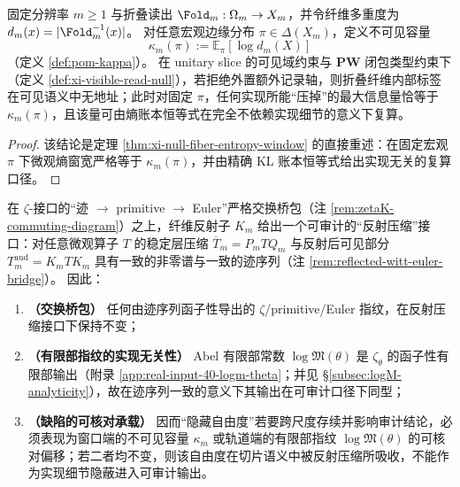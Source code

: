 \begin{theorem}\label{thm:xi-kappa-unique-carrier}
固定分辨率 \(m\ge 1\) 与折叠读出 \(\Fold_m:\Omega_m\to X_m\)，并令纤维多重度为 \(d_m(x)=|\Fold_m^{-1}(x)|\)。
对任意宏观边缘分布 \(\pi\in\Delta(X_m)\)，定义不可见容量
\[
\kappa_m(\pi):=\mathbb{E}_{\pi}[\log d_m(X)]
\]
（定义 \ref{def:pom-kappa}）。
在 unitary slice 的可见域约束与 \(\mathbf{PW}\) 闭包类型约束下（定义 \ref{def:xi-visible-read-null}），若拒绝外置额外记录轴，则折叠纤维内部标签在可见语义中无地址；此时对固定 \(\pi\)，任何实现所能“压掉”的最大信息量恰等于 \(\kappa_m(\pi)\)，且该量可由熵账本恒等式在完全不依赖实现细节的意义下复算。
\end{theorem}

\begin{proof}
该结论是定理 \ref{thm:xi-null-fiber-entropy-window} 的直接重述：在固定宏观 \(\pi\) 下微观熵窗宽严格等于 \(\kappa_m(\pi)\)，并由精确 KL 账本恒等式给出实现无关的复算口径。
\end{proof}

\begin{theorem}\label{thm:xi-defect-window-orbit-bridge}
在 \(\zeta\)-接口的“迹 \(\to\) primitive \(\to\) Euler”严格交换桥包（注 \ref{rem:zetaK-commuting-diagram}）之上，纤维反射子 \(K_m\) 给出一个可审计的“反射压缩”接口：对任意微观算子 \(T\) 的稳定层压缩 \(\overline T_m=P_mTQ_m\) 与反射后可见部分 \(T_m^{\mathrm{aud}}=K_mTK_m\) 具有一致的非零谱与一致的迹序列（注 \ref{rem:reflected-witt-euler-bridge}）。
因此：
\begin{enumerate}
  \item \textbf{（交换桥包）}
  任何由迹序列函子性导出的 \(\zeta\)/primitive/Euler 指纹，在反射压缩接口下保持不变；
  \item \textbf{（有限部指纹的实现无关性）}
  Abel 有限部常数 \(\log\mathfrak{M}(\theta)\) 是 \(\zeta_\theta\) 的函子性有限部输出（附录 \ref{app:real-input-40-logm-theta}；并见 \S\ref{subsec:logM-analyticity}），故在迹序列一致的意义下其输出在可审计口径下同型；
  \item \textbf{（缺陷的可核对承载）}
  因而“隐藏自由度”若要跨尺度存续并影响审计结论，必须表现为窗口端的不可见容量 \(\kappa_m\) 或轨道端的有限部指纹 \(\log\mathfrak{M}(\theta)\) 的可核对偏移；若二者均不变，则该自由度在切片语义中被反射压缩所吸收，不能作为实现细节隐蔽进入可审计输出。
\end{enumerate}
\end{theorem}

